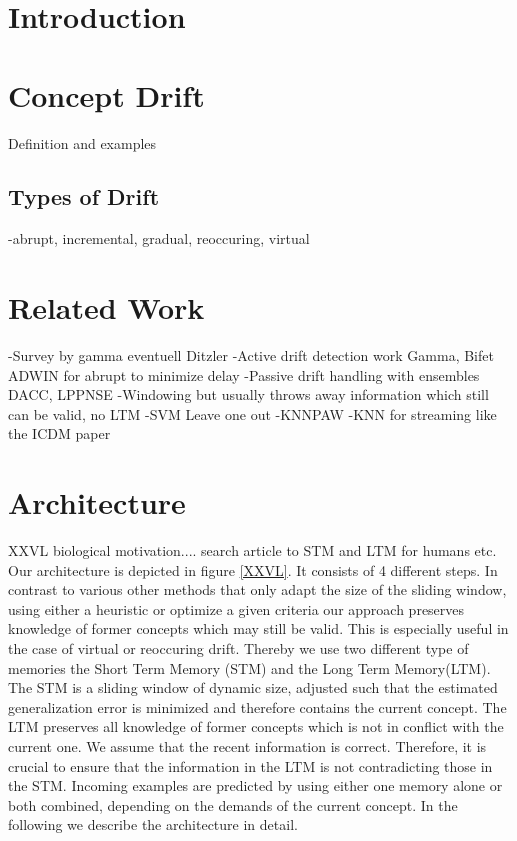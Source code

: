 \documentclass[conference]{IEEEtran}
\begin{document}
\IEEEpeerreviewmaketitle

\section{Introduction}
\section{Concept Drift}
Definition and examples
\subsection{Types of Drift}
-abrupt, incremental, gradual, reoccuring, virtual
\section{Related Work}
-Survey by gamma eventuell Ditzler
-Active drift detection work Gamma, Bifet ADWIN for abrupt to minimize delay
-Passive drift handling with ensembles DACC, LPPNSE
-Windowing but usually throws away information which still can be valid, no LTM
  -SVM Leave one out
  -KNNPAW 
-KNN for streaming like the ICDM paper


\section{Architecture}
XXVL biological motivation.... search article to STM and LTM for humans etc.
Our architecture is depicted in figure \ref{XXVL}. It consists of 4 different steps. 
In contrast to various other methods that only adapt the size of the sliding window, using either a heuristic \cite{XXVL} or optimize a given criteria \cite{XXVL} 
our approach preserves knowledge of former concepts which may still be valid. This is especially useful in the case of virtual or reoccuring drift.
Thereby we use two different type of memories the Short Term Memory (STM) and the Long Term Memory(LTM). The STM is a sliding window of dynamic size, adjusted such that the
estimated generalization error is minimized and therefore contains the current concept.
The LTM preserves all knowledge of former concepts which is not in conflict with the current one. We assume that the recent information is correct. 
Therefore, it is crucial to ensure that the information in the LTM is not contradicting those in the STM. Incoming examples are predicted
by using either one memory alone or both combined, depending on the demands of the current concept. In the following we describe the architecture in detail.
\end{document}
